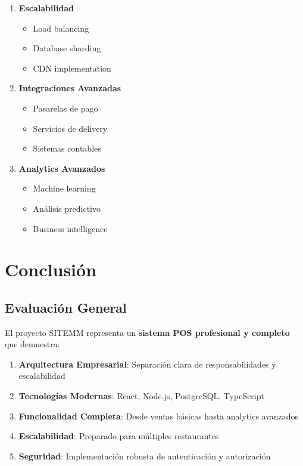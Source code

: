 \documentclass[12pt,a4paper]{article}
\begin{document}
\begin{enumerate}
    \item \textbf{Escalabilidad}
    \begin{itemize}
        \item Load balancing
        \item Database sharding
        \item CDN implementation
    \end{itemize}
    
    \item \textbf{Integraciones Avanzadas}
    \begin{itemize}
        \item Pasarelas de pago
        \item Servicios de delivery
        \item Sistemas contables
    \end{itemize}
    
    \item \textbf{Analytics Avanzados}
    \begin{itemize}
        \item Machine learning
        \item Análisis predictivo
        \item Business intelligence
    \end{itemize}
\end{enumerate}

\section{Conclusión}

\subsection{Evaluación General}

El proyecto SITEMM representa un \textbf{sistema POS profesional y completo} que demuestra:

\begin{enumerate}
    \item \textbf{Arquitectura Empresarial}: Separación clara de responsabilidades y escalabilidad
    \item \textbf{Tecnologías Modernas}: React, Node.js, PostgreSQL, TypeScript
    \item \textbf{Funcionalidad Completa}: Desde ventas básicas hasta analytics avanzados
    \item \textbf{Escalabilidad}: Preparado para múltiples restaurantes
    \item \textbf{Seguridad}: Implementación robusta de autenticación y autorización
\end{enumerate}
\end{document}

